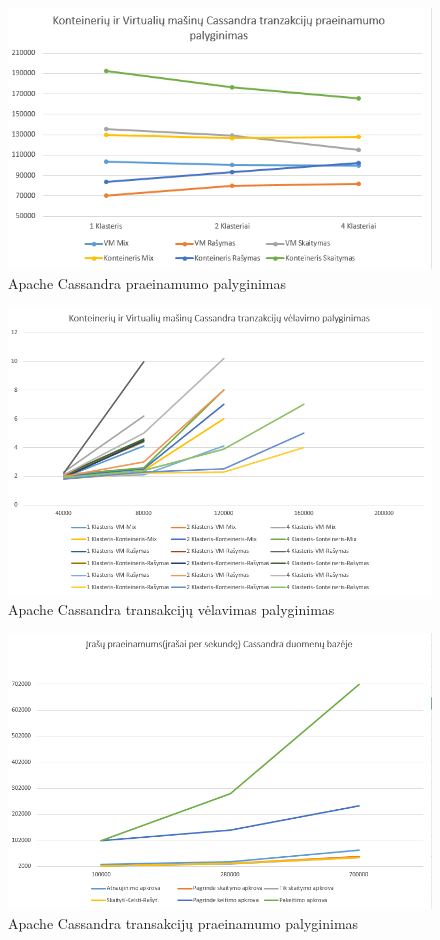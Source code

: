 \documentclass{VUMIFPSkursinis}
\begin{document}
\begin{figure}[H]
\centering
\includegraphics[scale=0.8]{img/CasTh}
\caption{Apache Cassandra praeinamumo palyginimas} %
\label{img:mlp}
\end{figure}
\begin{figure}[H]
\centering
\includegraphics[scale=0.8]{img/CasLat}
\caption{Apache Cassandra transakcijų vėlavimas palyginimas} %
\label{img:mlp}
\end{figure}
\begin{figure}[H]
\centering
\includegraphics[scale=0.8]{img/CasTp}
\caption{Apache Cassandra transakcijų praeinamumo palyginimas} %
\label{img:mlp}
\end{figure}
\end{document}
